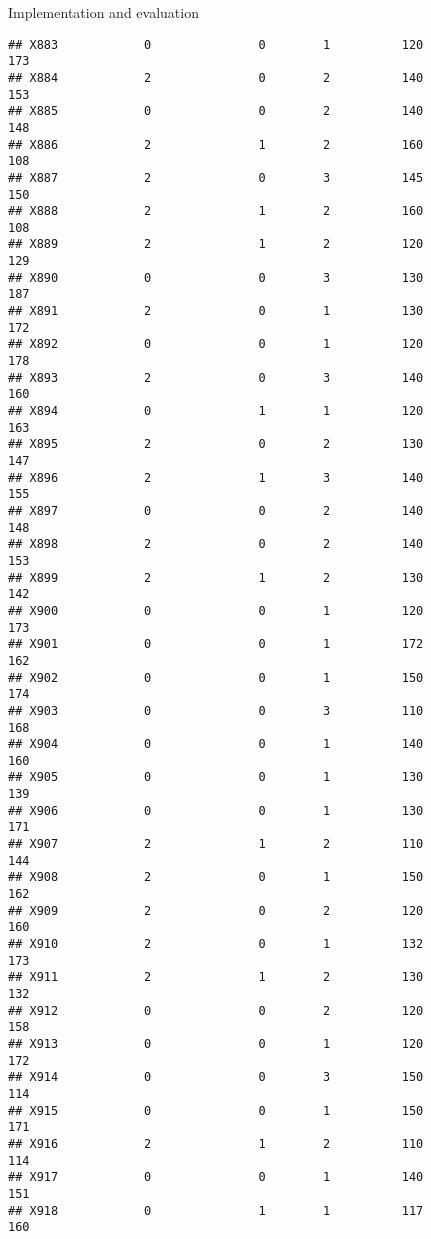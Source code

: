 \documentclass[
  ignorenonframetext,
]{beamer}
\begin{document}
\begin{frame}[fragile]{Implementation and evaluation}
\begin{verbatim}
## X883            0               0        1          120            173
## X884            2               0        2          140            153
## X885            0               0        2          140            148
## X886            2               1        2          160            108
## X887            2               0        3          145            150
## X888            2               1        2          160            108
## X889            2               1        2          120            129
## X890            0               0        3          130            187
## X891            2               0        1          130            172
## X892            0               0        1          120            178
## X893            2               0        3          140            160
## X894            0               1        1          120            163
## X895            2               0        2          130            147
## X896            2               1        3          140            155
## X897            0               0        2          140            148
## X898            2               0        2          140            153
## X899            2               1        2          130            142
## X900            0               0        1          120            173
## X901            0               0        1          172            162
## X902            0               0        1          150            174
## X903            0               0        3          110            168
## X904            0               0        1          140            160
## X905            0               0        1          130            139
## X906            0               0        1          130            171
## X907            2               1        2          110            144
## X908            2               0        1          150            162
## X909            2               0        2          120            160
## X910            2               0        1          132            173
## X911            2               1        2          130            132
## X912            0               0        2          120            158
## X913            0               0        1          120            172
## X914            0               0        3          150            114
## X915            0               0        1          150            171
## X916            2               1        2          110            114
## X917            0               0        1          140            151
## X918            0               1        1          117            160

\end{verbatim}
\end{frame}
\end{document}
